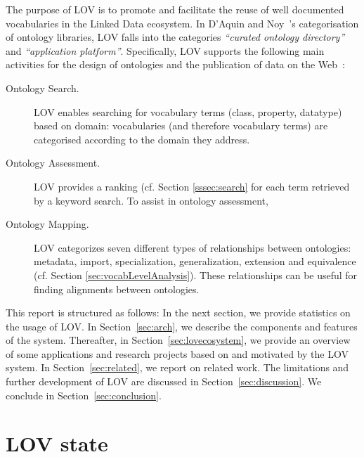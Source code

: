 \documentclass{iosart2c}
\begin{document}
The purpose of LOV is to promote and facilitate the reuse of well documented vocabularies in the Linked Data ecosystem. In D'Aquin and Noy~\cite{AquinJoWS12}'s categorisation of ontology libraries, LOV falls into the categories \textit{``curated ontology directory''}  and \textit{``application platform''}. Specifically, LOV supports the following main activities for the design of ontologies and the publication of data on the Web~\cite{MC10, ohdeploying, pedrinaci2014, villata2012}:

\begin{description}
 \item [Ontology Search.] LOV enables searching for vocabulary terms (class, property, datatype) based on domain: vocabularies (and therefore vocabulary terms) are categorised according to the domain they address.
 \item [Ontology Assessment.] LOV provides a ranking (cf. Section \ref{sssec:search} for each term retrieved by a keyword search. To assist in ontology assessment, 
 \item [Ontology Mapping.] LOV categorizes seven different types of relationships between ontologies: metadata, import, specialization, generalization, extension and equivalence (cf. Section \ref{sec:vocabLevelAnalysis}). These relationships can be useful for finding alignments between ontologies. 
\end{description}

This report is structured as follows: In the next section, we provide statistics on the usage of LOV. In Section~\ref{sec:arch}, we describe the components and features of the system. Thereafter, in Section~\ref{sec:lovecosystem}, we provide an overview of some applications and research projects based on and motivated by the LOV system. In Section~\ref{sec:related}, we report on related work. The limitations and further development of LOV are discussed in Section~\ref{sec:discussion}. We conclude in Section~\ref{sec:conclusion}.


\section{LOV state}\label{sec:state}
\end{document}

